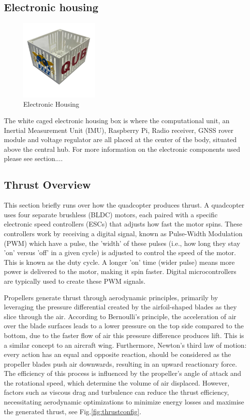 \documentclass{article}
\begin{document}
\subsection*{Electronic housing}
\begin{figure}[H]
  \centering
  \includegraphics[width=0.35\textwidth]{Pictures/electronic_housing.png} 
  \caption{Electronic Housing}
  \label{fig:electronic_housing}
\end{figure}
The white caged electronic housing box is where the computational unit, an
Inertial Measurement Unit (IMU), Raspberry Pi, Radio receiver, GNSS rover module
and voltage regulator are all placed at the center of the body, situated above
the central hub. For more information on the electronic components used please
see section....
 
\subsection{Thrust Overview}
This section briefly runs over how the quadcopter produces thrust. A quadcopter
uses four separate brushless (BLDC) motors, each paired with a specific
electronic speed controllers (ESCs) that adjusts how fast the motor spins. These
controllers work by receiving a digital signal, known as Pulse-Width Modulation
(PWM) which have a pulse, the 'width' of these pulses (i.e., how long they stay
'on' versus 'off' in a given cycle) is adjusted to control the speed of the
motor. This is known as the duty cycle. A longer 'on' time (wider pulse) means
more power is delivered to the motor, making it spin faster. Digital
microcontrollers are typically used to create these PWM signals.

Propellers generate thrust through aerodynamic principles, primarily by
leveraging the pressure differential created by the airfoil-shaped blades as
they slice through the air. According to Bernoulli's principle, the acceleration
of air over the blade surfaces leads to a lower pressure on the top side
compared to the bottom, due to the faster flow of air this pressure difference
produces lift. This is a similar concept to an aircraft wing. Furthermore,
Newton's third law of motion: every action has an equal and opposite reaction,
should be considered as the propeller blades push air downwards, resulting in an
upward reactionary force. The efficiency of this process is influenced by the
propeller's angle of attack and the rotational speed, which determine the volume
of air displaced. However, factors such as viscous drag and turbulence can
reduce the thrust efficiency, necessitating aerodynamic optimizations to
minimize energy losses and maximise the generated thrust, see
Fig.\ref{fig:thrustconfig}.
\end{document}
